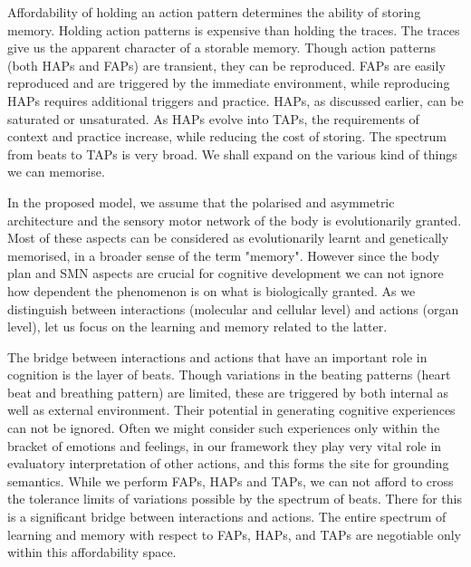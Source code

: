 Affordability of holding an action pattern determines the ability of storing memory. Holding action patterns is expensive than holding the traces. The traces give us the apparent character of a storable memory. Though action patterns (both HAPs and FAPs) are transient, they can be reproduced. FAPs are easily reproduced and are triggered by the immediate environment, while reproducing HAPs requires additional triggers and practice. HAPs, as discussed earlier, can be saturated or unsaturated. As HAPs evolve into TAPs, the requirements of context and practice increase, while reducing the cost of storing. The spectrum from beats to TAPs is very broad. We shall expand on the various kind of things we can memorise. 

In the proposed model, we assume that the polarised and asymmetric architecture and the sensory motor network of the body is evolutionarily granted. Most of these aspects can be considered as evolutionarily learnt and genetically memorised, in a broader sense of the term "memory". However since the body plan and SMN aspects are crucial for cognitive development we can not ignore how dependent the phenomenon is on what is biologically granted. As we distinguish between interactions (molecular and cellular level) and actions (organ level), let us focus on the learning and memory related to the latter. 

The bridge between interactions and actions that have an important role in cognition is the layer of beats. Though variations in the beating patterns (heart beat and breathing pattern) are limited, these are triggered by both internal as well as external environment. Their potential in generating cognitive experiences can not be ignored. Often we might consider such experiences only within the bracket of emotions and feelings, in our framework they play very vital role in evaluatory interpretation of other actions, and this forms the site for grounding semantics. While we perform FAPs, HAPs and TAPs, we can not afford to cross the tolerance limits of variations possible by the spectrum of beats. There for this is a significant bridge between interactions and actions. The entire spectrum of learning and memory with respect to FAPs, HAPs, and TAPs are negotiable only within this affordability space. 

